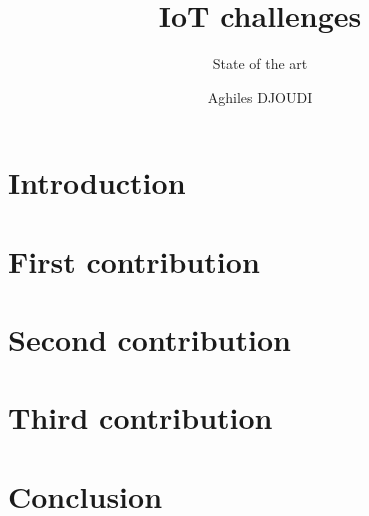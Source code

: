 \documentclass[8pt]{beamer}
\title{IoT challenges}
\subtitle{State of the art}
\author{Aghiles DJOUDI}
\institute{LIGM/ESIEE Paris \& ECE Paris}
\begin{document}
\firstpage

\section{Introduction}
		

\tableofcontent

\section{First contribution}
	
	
	
	
	

\section{Second contribution}
		
		
		
		
		

\section{Third contribution}
		
		
		
		
		

\section{Conclusion}
		


\frameBibliography
\end{document}
